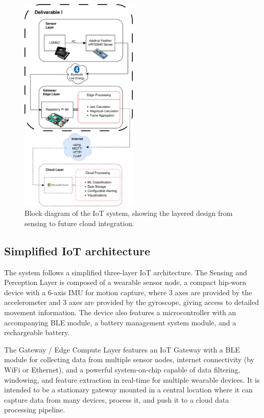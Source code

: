 \documentclass[conference]{IEEEtran}
\begin{document}
\begin{figure}[h]
	\centering
	\includegraphics[width=0.5\textwidth]{media/basic_architecture_overview.png}
	\caption{Block diagram of the IoT system, showing the layered design from sensing to future cloud integration.}
	\label{fig:block_diagram}
\end{figure}


\subsection{Simplified IoT architecture}

The system follows a simplified three-layer IoT architecture. The Sensing and Perception Layer is composed of a wearable sensor node, a compact hip-worn device with a 6-axis IMU for motion capture, where 3 axes are provided by the accelerometer and 3 axes are provided by the gyroscope, giving access to detailed movement information. The device also features a microcontroller with an accompanying BLE module, a battery management system module, and a rechargeable battery.

The Gateway / Edge Compute Layer features an IoT Gateway with a BLE module for collecting data from multiple sensor nodes, internet connectivity (by WiFi or Ethernet), and a powerful system-on-chip capable of data filtering, windowing, and feature extraction in real-time for multiple wearable devices. It is intended to be a stationary gateway mounted in a central location where it can capture data from many devices, process it, and push it to a cloud data processing pipeline.
\end{document}
